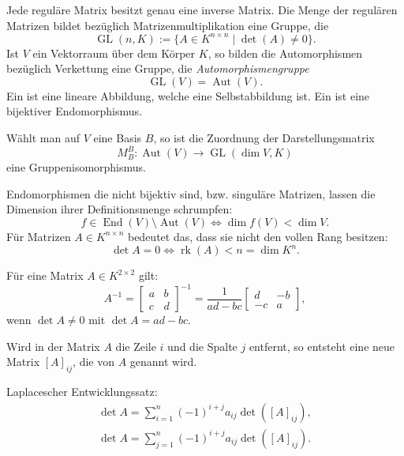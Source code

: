 \noindent
{}
Jede reguläre Matrix besitzt genau eine inverse Matrix. 
Die Menge der regulären Matrizen bildet bezüglich Matrizenmultiplikation
eine Gruppe, die
\begin{equation}
\operatorname{GL}(n,K) := \{A\in K^{n\times n}\mid\det(A)\ne 0\}.
\end{equation}
Ist $V$ ein Vektorraum über dem Körper $K$, so bilden die
Automorphismen bezüglich Verkettung eine Gruppe, die
\emph{Automorphismengruppe}
\begin{equation}
\operatorname{GL}(V) = \operatorname{Aut}(V).
\end{equation}
Ein 
ist eine lineare Abbildung, welche eine Selbstabbildung ist.
Ein 
ist eine bijektiver Endomorphismus.

Wählt man auf $V$ eine Basis
$B$, so ist die Zuordnung der Darstellungsmatrix
\begin{equation}
M_B^B\colon \operatorname{Aut}(V)\to\operatorname{GL}(\dim V,K)
\end{equation}
eine Gruppenisomorphismus.

Endomorphismen die nicht bijektiv sind, bzw. singuläre Matrizen,
lassen die Dimension ihrer Definitionsmenge schrumpfen:
\begin{equation}
f{\in}\operatorname{End}(V){\setminus}\operatorname{Aut}(V)
\Longleftrightarrow \dim f(V)<\dim V.
\end{equation}
Für Matrizen $A\in K^{n\times n}$ bedeutet das, dass sie nicht
den vollen Rang besitzen:
\begin{equation}
\det A=0\iff \operatorname{rk}(A) < n = \dim K^n.
\end{equation}

Für eine Matrix $A\in K^{2\times 2}$ gilt:
\begin{equation}
A^{-1} = \begin{bmatrix}
a & b\\
c & d
\end{bmatrix}^{-1}
= \frac{1}{ad-bc}\begin{bmatrix}
d & -b\\
-c & a
\end{bmatrix},
\end{equation}
wenn $\det A\ne 0$ mit $\det A = ad-bc$.

\begin{definition}[Streichungsmatrix]
Wird in der Matrix $A$ die Zeile $i$ und die Spalte $j$ entfernt,
so entsteht eine neue Matrix $[A]_{ij}$, die
von $A$ genannt wird.
\end{definition}
Laplacescher Entwicklungssatz:
\begin{align}
\det A = \sum_{i=1}^n (-1)^{i+j}a_{ij}\det([A]_{ij}),\\
\det A = \sum_{j=1}^n (-1)^{i+j}a_{ij}\det([A]_{ij}).
\end{align}

